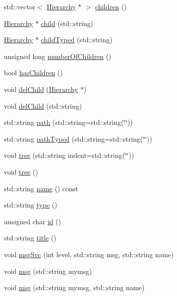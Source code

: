 \begin{DoxyCompactItemize}
std::vector$<$ \hyperlink{classHierarchy}{Hierarchy} $\ast$ $>$ \hyperlink{classHierarchy_aa9a76f69e98e052ee1a6e32cea006288}{children} ()
\item 
\hyperlink{classHierarchy}{Hierarchy} $\ast$ \hyperlink{classHierarchy_a1e207f973c694b538bf90107b4868817}{child} (std::string)
\item 
\hyperlink{classHierarchy}{Hierarchy} $\ast$ \hyperlink{classHierarchy_a0c15a5276a3b80b4354d6bd8a01e0708}{childTyped} (std::string)
\item 
unsigned long \hyperlink{classHierarchy_ab16e84de65fd84e14001a6cf941c8be4}{numberOfChildren} ()
\item 
bool \hyperlink{classHierarchy_a255174fe4d316d2a3f430dcb9dab29f1}{hasChildren} ()
\item 
void \hyperlink{classHierarchy_a2b2b359fac003233f65786a616766bde}{delChild} (\hyperlink{classHierarchy}{Hierarchy} $\ast$)
\item 
void \hyperlink{classHierarchy_a1928ac7615fe0b5e55cd707f70dc6781}{delChild} (std::string)
\item 
std::string \hyperlink{classHierarchy_aa7990fa7caf132d83e361ce033c6c65a}{path} (std::string=std::string(\char`\"{}\char`\"{}))
\item 
std::string \hyperlink{classHierarchy_a1efd56cd164d328d2002e53a10a19b8c}{pathTyped} (std::string=std::string(\char`\"{}\char`\"{}))
\item 
void \hyperlink{classHierarchy_a76e914b9a677a22a82deb74d892bf261}{tree} (std::string indent=std::string(\char`\"{}\char`\"{}))
\item 
void \hyperlink{classHierarchy_a594c294c5f60c230e106d522ed008212}{tree} ()
\item 
std::string \hyperlink{classObject_a975e888d50bfcbffda2c86368332a5cd}{name} () const 
\item 
std::string \hyperlink{classObject_a84f99f70f144a83e1582d1d0f84e4e62}{type} ()
\item 
unsigned char \hyperlink{classObject_af99145335cc61ff6e2798ea17db009d2}{id} ()
\item 
std::string \hyperlink{classObject_a73a0f1a41828fdd8303dd662446fb6c3}{title} ()
\item 
void \hyperlink{classObject_a3f9d5537ebce0c0f2bf6ae4d92426f3c}{msgSvc} (int level, std::string msg, std::string name)
\item 
void \hyperlink{classObject_a58b2d0618c2d08cf2383012611528d97}{msg} (std::string mymsg)
\item 
void \hyperlink{classObject_ac5d59299273cee27aacf7de00d2e7034}{msg} (std::string mymsg, std::string name)

\end{DoxyCompactItemize}
